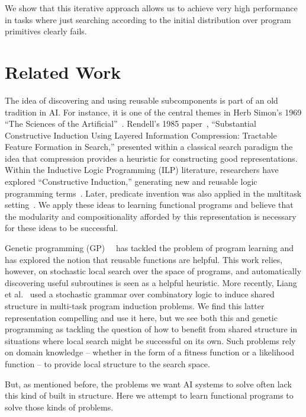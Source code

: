 \documentclass{article}
\begin{document}
We show that this iterative approach allows us to achieve very high
performance in tasks where just searching according to the initial
distribution over program primitives clearly fails.


\section{Related Work}
The idea of discovering and using reusable subcomponents is part of an
old tradition in AI. For instance, it is one of the central themes in
Herb Simon's 1969 ``The Sciences of the
Artificial''~\cite{simon1996sciences}. Rendell's 1985
paper~\cite{DBLP:conf/ijcai/Rendell85}, ``Substantial Constructive
Induction Using Layered Information Compression: Tractable Feature
Formation in Search,'' presented within a classical search paradigm
the idea that compression provides a heuristic for constructing good
representations. Within the Inductive Logic Programming (ILP)
literature, researchers have explored ``Constructive Induction,''
generating new and reusable logic programming
terms~\cite{DBLP:conf/ijcai/Muggleton87}. Later, predicate invention
was also applied in the multitask
setting~\cite{DBLP:conf/ilp/KhanMP98}. We apply these ideas to
learning functional programs and believe that the modularity and
compositionality afforded by this representation is necessary for
these ideas to be successful.


Genetic programming
(GP)~\cite{DBLP:conf/foga/Koza92}~\cite{DBLP:conf/ices/KozaBAK96} has
tackled the problem of program learning and has explored the notion
that reusable functions are helpful. This work relies, however, on
stochastic local search over the space of programs, and automatically
discovering useful subroutines is seen as a helpful heuristic. More
recently, Liang et al.~\cite{liang10programs} used a stochastic
grammar over combinatory logic to induce shared structure in
multi-task program induction problems. We find this latter
representation compelling and use it here, but we see both this and
genetic programming as tackling the question of how to benefit from
shared structure in situations where local search might be successful
on its own. Such problems rely on domain knowledge -- whether in the
form of a fitness function or a likelihood function -- to provide
local structure to the search space.

But, as mentioned before, the problems we want AI systems to solve
often lack this kind of built in structure. Here we attempt to learn
functional programs to solve those kinds of problems.  \\
\end{document}
